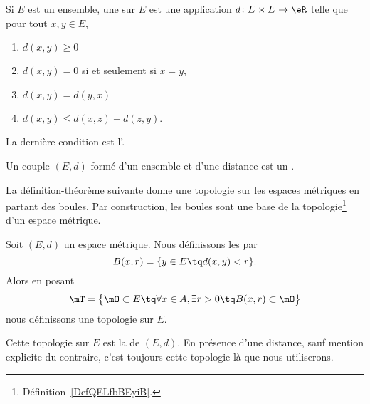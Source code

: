 \begin{definition}  \label{DefMVNVFsX}
    Si $E$ est un ensemble, une  sur $E$ est une application $d\colon E\times E\to \eR$ telle que pour tout $x,y\in E$,
    \begin{enumerate}

    \item
    $d(x,y)\geq 0$

    \item
    $d(x,y)=0$ si et seulement si $x=y$,

    \item
    $d(x,y)=d(y,x)$

    \item
    $d(x,y)\leq d(x,z)+d(z,y)$.

    \end{enumerate}
    La dernière condition est l'.

    Un couple $(E,d)$ formé d'un ensemble et d'une distance est un .
\end{definition}

La définition-théorème suivante donne une topologie sur les espaces métriques en partant des boules. Par construction, les boules sont une base de la topologie\footnote{Définition~\ref{DefQELfbBEyiB}.} d'un espace métrique.

\begin{theoremDef}     \label{ThoORdLYUu}
    Soit \( (E,d)\) un espace métrique. Nous définissons les  par
    \begin{equation}        \label{EQooYCWSooIhibvd}
        B(x,r)=\{ y\in E\tq d(x,y)<r \}.
    \end{equation}
    Alors en posant
    \begin{equation}        \label{EqGDVVooDZfwSf}
        \mT=\big\{  \mO\subset E  \tq\forall x\in A,\exists r>0\tq B(x,r)\subset \mO \big\}
    \end{equation}
    nous définissons une topologie sur \( E\).

    Cette topologie sur \( E\) est la  de \( (E,d)\). En présence d'une distance, sauf mention explicite du contraire, c'est toujours cette topologie-là que nous utiliserons.
\end{theoremDef}

